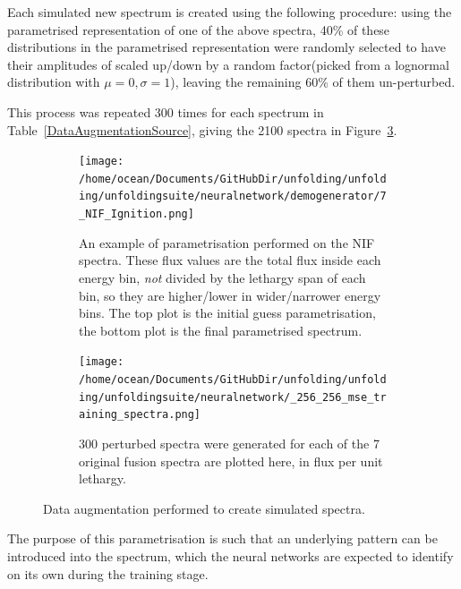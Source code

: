 \documentclass[a4paper, 12pt]{article}
\begin{document}
    Each simulated new spectrum is created using the following procedure: using the parametrised representation of one of the above spectra, 40\% of these distributions in the parametrised representation were randomly selected to have their amplitudes of scaled up/down by a random factor(picked from a lognormal distribution with $\mu =0, \sigma = 1$), leaving the remaining 60\% of them un-perturbed.

    This process was repeated 300 times for each spectrum in Table~\ref{DataAugmentationSource}, giving the 2100 spectra in Figure~\ref{SimulatedCollection}.

    \begin{figure}
    \centering
        \begin{subfigure}[b]{.4\linewidth}
            \texttt{[image: /home/ocean/Documents/GitHubDir/unfolding/unfolding/unfoldingsuite/neuralnetwork/demogenerator/7\_NIF\_Ignition.png]}
            \caption{An example of parametrisation performed on the NIF spectra. These flux values are the total flux inside each energy bin, \emph{not} divided by the lethargy span of each bin, so they are higher/lower in wider/narrower energy bins. The top plot is the initial guess parametrisation, the bottom plot is the final parametrised spectrum.}\label{Parametrisation}
        \end{subfigure}
        \hfill
        \begin{subfigure}[b]{.55\linewidth}
            \texttt{[image: /home/ocean/Documents/GitHubDir/unfolding/unfolding/unfoldingsuite/neuralnetwork/\_256\_256\_mse\_training\_spectra.png]}
            \caption{300 perturbed spectra were generated for each of the 7 original fusion spectra are plotted here, in flux per unit lethargy.}\label{SimulatedCollection}
        \end{subfigure}
    \caption{Data augmentation performed to create simulated spectra.}
    \end{figure}

    The purpose of this parametrisation is such that an underlying pattern can be introduced into the spectrum, which the neural networks are expected to identify on its own during the training stage.
\end{document}
